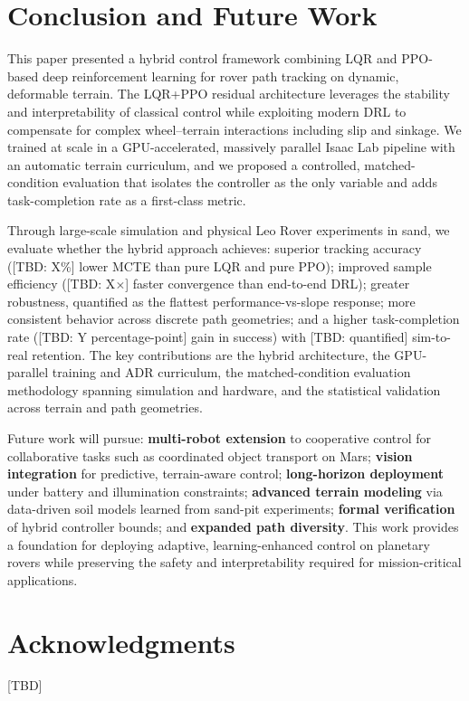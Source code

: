 \documentclass[conference]{IEEEtran}
\begin{document}
\section{Conclusion and Future Work}
This paper presented a hybrid control framework combining LQR and PPO-based deep reinforcement learning for rover path tracking on dynamic, deformable terrain. The LQR+PPO residual architecture leverages the stability and interpretability of classical control while exploiting modern DRL to compensate for complex wheel--terrain interactions including slip and sinkage. We trained at scale in a GPU-accelerated, massively parallel Isaac Lab pipeline with an automatic terrain curriculum, and we proposed a controlled, matched-condition evaluation that isolates the controller as the only variable and adds task-completion rate as a first-class metric.

Through large-scale simulation and physical Leo Rover experiments in sand, we evaluate whether the hybrid approach achieves: superior tracking accuracy ([TBD: X\%] lower MCTE than pure LQR and pure PPO); improved sample efficiency ([TBD: X$\times$] faster convergence than end-to-end DRL); greater robustness, quantified as the flattest performance-vs-slope response; more consistent behavior across discrete path geometries; and a higher task-completion rate ([TBD: Y percentage-point] gain in success) with [TBD: quantified] sim-to-real retention. The key contributions are the hybrid architecture, the GPU-parallel training and ADR curriculum, the matched-condition evaluation methodology spanning simulation and hardware, and the statistical validation across terrain and path geometries.

Future work will pursue: \textbf{multi-robot extension} to cooperative control for collaborative tasks such as coordinated object transport on Mars; \textbf{vision integration} for predictive, terrain-aware control; \textbf{long-horizon deployment} under battery and illumination constraints; \textbf{advanced terrain modeling} via data-driven soil models learned from sand-pit experiments; \textbf{formal verification} of hybrid controller bounds; and \textbf{expanded path diversity}. This work provides a foundation for deploying adaptive, learning-enhanced control on planetary rovers while preserving the safety and interpretability required for mission-critical applications.

\section*{Acknowledgments}
[TBD]



\end{document}
